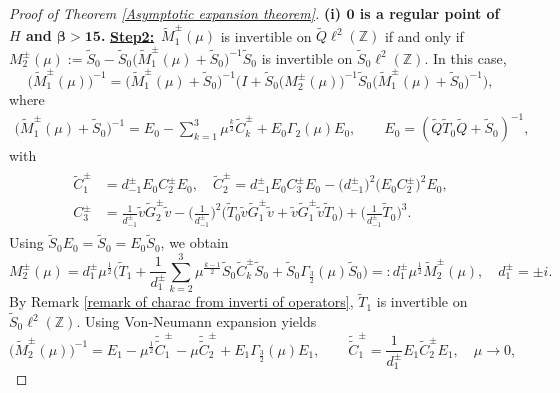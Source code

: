 \documentclass[reqno, 11pt]{amsart}
\newcommand\Z{\mathbb{Z}}
\numberwithin{equation}{section}
\begin{document}
\begin{proof}[Proof of Theorem {\rm\ref{Asymptotic expansion theorem}}]{\bf{(i) ${\bm{0}}$ is a regular point of $H$ and {$\bm{\beta>15}$}.}}
\vskip0.15cm
{\bf{\underline{Step2:}}}\ $\widetilde{M}_{1}^{\pm}(\mu)$ is invertible on $\widetilde{Q}\ell^{2}(\Z)$ if and only if $ M^{\pm}_{2}(\mu):=\widetilde{S}_0-\widetilde{S}_0\big(\widetilde{M}_{1}^{\pm}(\mu)+\widetilde{S}_0\big)^{-1}\widetilde{S}_0$ is invertible on $\widetilde{S}_0\ell^{2}(\Z)$. In this case,
\begin{equation}\label{Relat of M1 tuta and M2 at 2}
\big(\widetilde{M}_{1}^{\pm}(\mu)\big)^{-1}=\big(\widetilde{M}_{1}^{\pm}(\mu)+\widetilde{S}_0\big)^{-1}\Big(I+\widetilde{S}_0\big(M^{\pm}_{2}(\mu)\big)^{-1}\widetilde{S}_0\big(\widetilde{M}_{1}^{\pm}(\mu)+\widetilde{S}_0\big)^{-1}\Big),
\end{equation}
where
\begin{align*}
\big(\widetilde{M}_{1}^{\pm}(\mu)+\widetilde{S}_0\big)^{-1}=E_0-\sum\limits_{k=1}^{3}\mu^{\frac{k}{2}}\widetilde{C}^{\pm}_{k}+E_0\Gamma_{2}(\mu)E_0,\qquad E_0=(\widetilde{Q}\widetilde{T}_0\widetilde{Q}+\widetilde{S}_0)^{-1},
\end{align*}
with 
\begin{align}\label{Ctutak}
\begin{split}
\widetilde{C}^{\pm}_{1}&=d^{\pm}_{-1}E_0C^{\pm}_{2}E_0,\quad \widetilde{C}^{\pm}_{2}=d^{\pm}_{-1}E_0C^{\pm}_{3}E_0-\big(d^{\pm}_{-1}\big)^2\big(E_0C^{\pm}_2\big)^2E_0,\\
C^{\pm}_{3}&=\frac{1}{d^{\pm}_{-1}}\tilde{v}\widetilde{G}^{\pm}_2\tilde{v}-\Big(\frac{1}{d^{\pm}_{-1}}\Big)^2\Big(\widetilde{T}_0\tilde{v}\widetilde{G}^{\pm}_1\tilde{v}+\tilde{v}\widetilde{G}^{\pm}_1\tilde{v}\widetilde{T}_0\Big)+\Big(\frac{1}{d^{\pm}_{-1}}\widetilde{T}_0\Big)^3.
\end{split}
\end{align}
Using $\widetilde{S}_0E_0=\widetilde{S}_0=E_0\widetilde{S}_0$, we obtain
\begin{equation}\label{Relat of M2 and M2 tuta at 2}
M^{\pm}_2(\mu)=d^{\pm}_1\mu^{\frac{1}{2}}\Big(\widetilde{T}_1+\frac{1}{d^{\pm}_{1}}\sum\limits_{k=2}^{3}\mu^{\frac{k-1}{2}}\widetilde{S}_0\widetilde{C}_{k}^{\pm}\widetilde{S}_0+\widetilde{S}_0\Gamma_{\frac{3}{2}}(\mu)\widetilde{S}_0\Big)=:d^{\pm}_1\mu^{\frac{1}{2}}\widetilde{M}^{\pm}_2(\mu),\quad d^{\pm}_1=\pm i.
\end{equation}
By Remark \ref{remark of charac from inverti of operators}, $\widetilde{T}_1$ is invertible on $\widetilde{S}_0\ell^2(\Z)$. Using Von-Neumann expansion yields
\begin{equation}\label{inverse of Mtuta2}
\big(\widetilde{M}_{2}^{\pm}(\mu)\big)^{-1}=E_1-\mu^{\frac{1}{2}}\tilde{\tilde{C}}^{\pm}_{1}-\mu \tilde{\tilde{C}}^{\pm}_2+E_1\Gamma_{\frac{3}{2}}(\mu)E_1,\qquad \tilde{\tilde{C}}^{\pm}_{1}=\frac{1}{d^{\pm}_1}E_1\widetilde{C}^{\pm}_2E_1,\quad \mu\rightarrow0,

\end{equation}
\end{proof}
\end{document}
